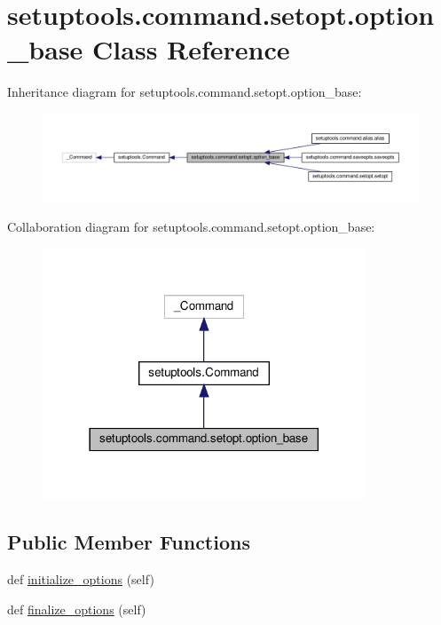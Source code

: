 \hypertarget{classsetuptools_1_1command_1_1setopt_1_1option__base}{}\section{setuptools.\+command.\+setopt.\+option\+\_\+base Class Reference}
\label{classsetuptools_1_1command_1_1setopt_1_1option__base}


Inheritance diagram for setuptools.\+command.\+setopt.\+option\+\_\+base\+:
\nopagebreak
\begin{figure}[H]
\begin{center}
\leavevmode
\includegraphics[width=350pt]{classsetuptools_1_1command_1_1setopt_1_1option__base__inherit__graph}
\end{center}
\end{figure}


Collaboration diagram for setuptools.\+command.\+setopt.\+option\+\_\+base\+:
\nopagebreak
\begin{figure}[H]
\begin{center}
\leavevmode
\includegraphics[width=273pt]{classsetuptools_1_1command_1_1setopt_1_1option__base__coll__graph}
\end{center}
\end{figure}
\subsection*{Public Member Functions}
\begin{DoxyCompactItemize}
\item 
def \hyperlink{classsetuptools_1_1command_1_1setopt_1_1option__base_a6a84366f824dca28ccda2b6c4dfa13fd}{initialize\+\_\+options} (self)
\item 
def \hyperlink{classsetuptools_1_1command_1_1setopt_1_1option__base_a20bf2d2ef02bd4b89cfdee7dd3be8805}{finalize\+\_\+options} (self)
\end{DoxyCompactItemize}

